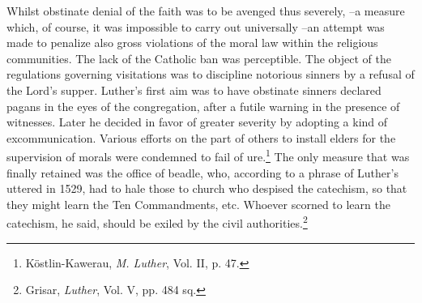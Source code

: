 Whilst obstinate denial of the faith was to be avenged thus severely,
--a measure which, of course, it was impossible to carry out universally
--an attempt was made to penalize also gross violations of the
moral law within the religious communities. The lack of the Catholic
ban was perceptible. The object of the regulations governing visitations
was to discipline notorious sinners by a refusal of the Lord’s supper.
Luther’s first aim was to have obstinate sinners declared pagans
in the eyes of the congregation, after a futile warning in the presence of
witnesses. Later he decided in favor of greater severity by adopting
a kind of excommunication. Various efforts on the part of others to
install elders for the supervision of morals were condemned to fail of
ure.\footnote{Köstlin-Kawerau, \textit{M. Luther}, Vol. II, p. 47.}
 The only measure that was finally retained was the office of
beadle, who, according to a phrase of Luther’s uttered in 1529, had
to hale those to church who despised the catechism, so that they might
learn the Ten Commandments, etc. Whoever scorned to learn the catechism,
he said, should be exiled by the civil authorities.\footnote{Grisar, \textit{Luther}, Vol. V, pp. 484 sq.}
